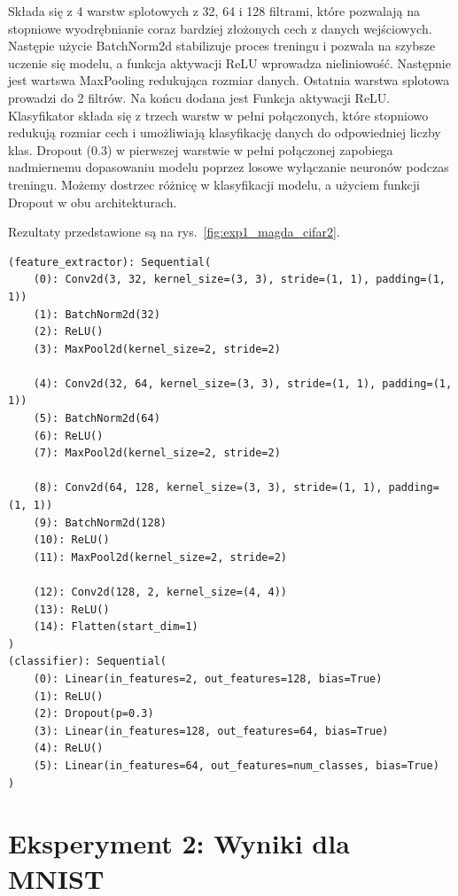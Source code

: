 \documentclass[10pt]{article}
\begin{document}
Składa się z 4 warstw splotowych z 32, 64 i 128 filtrami, które pozwalają na stopniowe wyodrębnianie coraz bardziej złożonych cech z danych wejściowych.
Następie użycie BatchNorm2d stabilizuje proces treningu i pozwala na szybsze uczenie się modelu, a funkcja aktywacji ReLU wprowadza nieliniowość.
Następnie jest wartswa MaxPooling redukująca rozmiar danych.
Ostatnia warstwa splotowa prowadzi do 2 filtrów.
Na końcu dodana jest Funkcja aktywacji ReLU\@.
Klasyfikator składa się z trzech warstw w pełni połączonych, które stopniowo redukują rozmiar cech i umożliwiają klasyfikację danych do odpowiedniej liczby klas.
Dropout (0.3) w pierwszej warstwie w pełni połączonej zapobiega nadmiernemu dopasowaniu modelu poprzez losowe wyłączanie neuronów podczas treningu.
Możemy dostrzec różnicę w klasyfikacji modelu, a użyciem funkcji Dropout w obu architekturach.

Rezultaty przedstawione są na rys.~\ref{fig:exp1_magda_cifar2}.

\tiny
\begin{verbatim}
(feature_extractor): Sequential(
    (0): Conv2d(3, 32, kernel_size=(3, 3), stride=(1, 1), padding=(1, 1))
    (1): BatchNorm2d(32)
    (2): ReLU()
    (3): MaxPool2d(kernel_size=2, stride=2)

    (4): Conv2d(32, 64, kernel_size=(3, 3), stride=(1, 1), padding=(1, 1))
    (5): BatchNorm2d(64)
    (6): ReLU()
    (7): MaxPool2d(kernel_size=2, stride=2)

    (8): Conv2d(64, 128, kernel_size=(3, 3), stride=(1, 1), padding=(1, 1))
    (9): BatchNorm2d(128)
    (10): ReLU()
    (11): MaxPool2d(kernel_size=2, stride=2)

    (12): Conv2d(128, 2, kernel_size=(4, 4))
    (13): ReLU()
    (14): Flatten(start_dim=1)
)
(classifier): Sequential(
    (0): Linear(in_features=2, out_features=128, bias=True)
    (1): ReLU()
    (2): Dropout(p=0.3)
    (3): Linear(in_features=128, out_features=64, bias=True)
    (4): ReLU()
    (5): Linear(in_features=64, out_features=num_classes, bias=True)
)
\end{verbatim}
\normalsize



\pagebreak
\section{Eksperyment 2: Wyniki dla MNIST}\label{sec:ex2_mnist}
\end{document}
